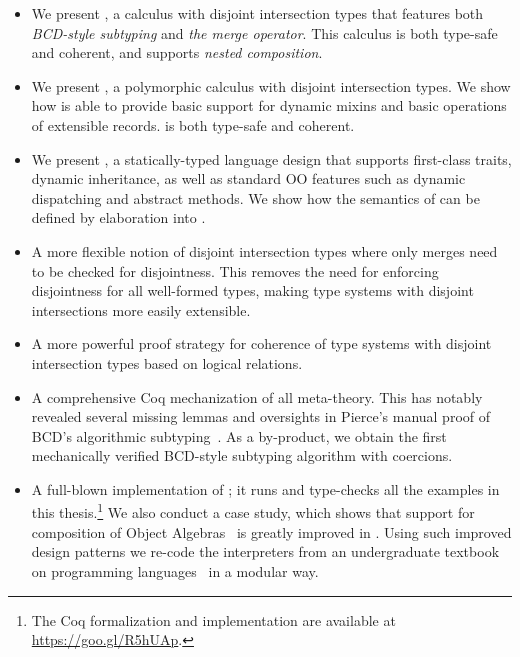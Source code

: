 \begin{itemize}

\item We present \namee, a calculus with disjoint intersection types that
  features both \emph{BCD-style subtyping} and \emph{the merge operator}. This
  calculus is both type-safe and coherent, and supports \emph{nested composition}.

\item We present \fnamee, a polymorphic calculus with disjoint intersection
  types. We show how \fnamee is able to provide basic support for dynamic mixins
  and basic operations of extensible records. \fnamee is both type-safe and
  coherent.

\item We present \sedel, a statically-typed language design that supports
  first-class traits, dynamic inheritance, as well as standard OO features such
  as dynamic dispatching and abstract methods. We show how the semantics of
  \sedel can be defined by elaboration into \fnamee.

\item A more flexible notion of disjoint intersection types where only merges
  need to be checked for disjointness. This removes the need for enforcing
  disjointness for all well-formed types, making type systems with disjoint
  intersections more easily extensible.

\item A more powerful proof strategy for coherence of type systems with disjoint
  intersection types based on logical relations.


\item A comprehensive Coq mechanization of all meta-theory. This has notably
  revealed several missing lemmas and oversights in Pierce's manual
  proof of BCD's algorithmic subtyping~\citep{pierce1989decision}. As a
  by-product, we obtain the first mechanically verified BCD-style subtyping
  algorithm with coercions.

\item A full-blown implementation of \sedel; it runs and type-checks all the
  examples in this thesis.\footnote{The Coq formalization and implementation are
    available at \url{https://goo.gl/R5hUAp}.} We also conduct a case study,
  which shows that support for composition of Object
  Algebras~\citep{oliveira2012extensibility} is greatly
  improved in \sedel. Using such improved design patterns we re-code the
  interpreters from an undergraduate textbook on programming
  languages~\citep{poplcook} in a modular way.

\end{itemize}


